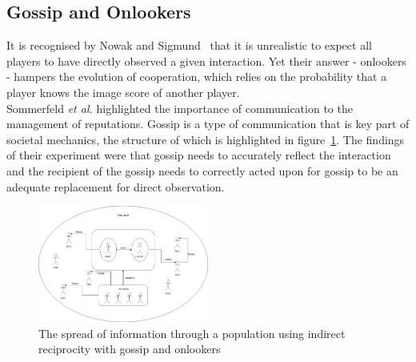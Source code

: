 \documentclass[twoside,twocolumn]{article}
\begin{document}
\subsection{Gossip and Onlookers}
It is recognised by Nowak and Sigmund~\cite{evol_indirect_image} that it is unrealistic to expect all players to have directly observed a given interaction. Yet their answer - onlookers - hampers the evolution of cooperation, which relies on the probability that a player knows the image score of another player.\\
Sommerfeld \textit{et al.} highlighted the importance of communication to the management of reputations. Gossip is a type of communication that is key part of societal mechanics, the structure of which is highlighted in figure~\ref{fig:gossip_and_onlookers}. The findings of their experiment were that gossip needs to accurately reflect the interaction and the recipient of the gossip needs to correctly acted upon for gossip to be an adequate replacement for direct observation.
\begin{figure}
	\includegraphics[width=0.5\textwidth]{Gossip_and_onlookers.png}
	\caption{The spread of information through a population using indirect reciprocity with gossip and onlookers}
	\label{fig:gossip_and_onlookers}
\end{figure}
\end{document}
